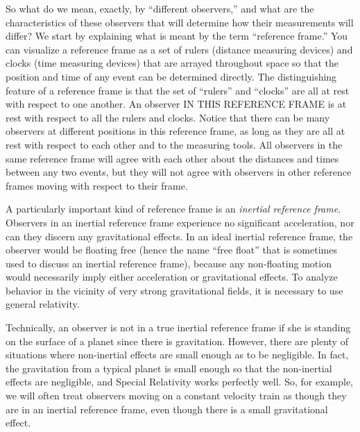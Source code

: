    
So what do we mean, exactly, by ``different observers,'' and what
are the characteristics of these observers that will determine how
their measurements will differ?  We start by explaining what is meant
by the term ``reference frame.'' You can visualize a reference frame
as a set of rulers (distance measuring devices) and clocks (time
measuring devices) that are arrayed throughout space so that the
position and time of any event can be determined directly.  The distinguishing
feature of a reference frame is that the set of ``rulers'' and ``clocks''
are all at rest with respect to one another.  An observer IN THIS
REFERENCE FRAME is at rest with respect to all the rulers and clocks.
Notice that there can be many observers at different positions
in this reference frame, as long as they are all at rest with respect
to each other and to the measuring tools. All observers in the same
reference frame will agree with each other about the distances and
times between any two events, but they will not agree with observers
in other reference frames moving with respect to their frame.

A particularly important kind of reference frame is an {\em
inertial reference frame}.  Observers in an inertial reference
frame experience no significant acceleration, nor can they discern any
gravitational effects.  In an ideal inertial reference frame, the
observer would be floating free (hence the name ``free float'' that is
sometimes used to discuss an inertial reference frame), because any
non-floating motion would necessarily imply either acceleration or
gravitational effects.  To analyze behavior in the vicinity of very
strong gravitational fields, it is necessary to use general
relativity.
   
Technically, an observer is not in a true inertial reference frame if
she is standing on the surface of a planet since there is gravitation.
However, there are plenty of situations where non-inertial effects are
small enough as to be negligible.  In fact, the gravitation from a
typical planet is small enough so that the non-inertial effects are
negligible, and Special Relativity works perfectly well.  So, for
example, we will often treat observers moving on a constant velocity
train as though they are in an inertial reference frame, even though
there is a small gravitational effect.
   
